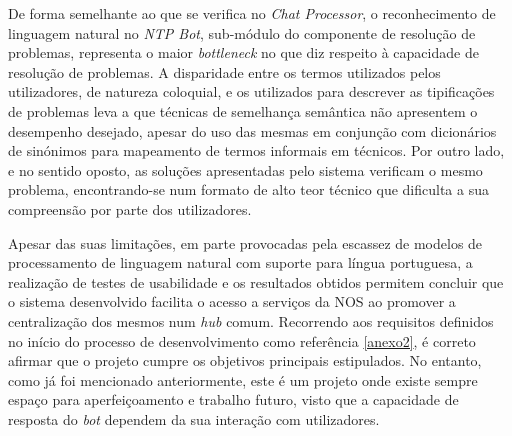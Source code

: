 \documentclass[11pt,a4paper]{article}
\begin{document}
De forma semelhante ao que se verifica no \textit{Chat Processor}, o reconhecimento de linguagem natural no
\textit{NTP Bot}, sub-módulo do componente de resolução de problemas, representa o maior \textit{bottleneck}
no que diz respeito à capacidade de resolução de problemas. A disparidade entre os termos utilizados pelos
utilizadores, de natureza coloquial, e os utilizados para descrever as tipificações de problemas leva a que
técnicas de semelhança semântica não apresentem o desempenho desejado, apesar do uso das mesmas em conjunção
com dicionários de sinónimos para mapeamento de termos informais em técnicos. Por outro lado, e no sentido
oposto, as soluções apresentadas pelo sistema verificam o mesmo problema, encontrando-se num formato de alto
teor técnico que dificulta a sua compreensão por parte dos utilizadores.

Apesar das suas limitações, em parte provocadas pela escassez de modelos de processamento de linguagem natural
com suporte para língua portuguesa, a realização de testes de usabilidade e os resultados obtidos permitem
concluir que o sistema desenvolvido facilita o acesso a serviços da NOS ao promover a centralização dos mesmos
num \textit{hub} comum. 
Recorrendo aos requisitos definidos no início do processo de desenvolvimento como referência \ref{anexo2}, é correto afirmar
que o projeto cumpre os objetivos principais estipulados. No entanto, como já foi mencionado anteriormente, 
este é um projeto onde existe sempre espaço para aperfeiçoamento e trabalho futuro, visto que a capacidade
de resposta do \textit{bot} dependem da sua interação com utilizadores.

\newpage
\end{document}
